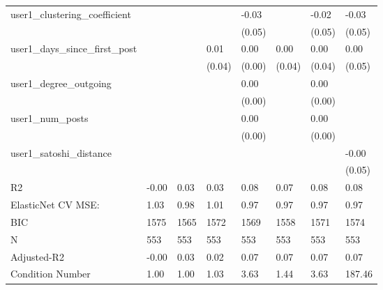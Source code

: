 \begin{table}
\begin{center}
\begin{tabular}{llllllll}
user1_clustering_coefficient                   &          &            &         & -0.03   &          & -0.02              & -0.03    \\
                                               &          &            &         & (0.05)  &          & (0.05)             & (0.05)   \\
user1_days_since_first_post                    &          &            & 0.01    & 0.00    & 0.00     & 0.00               & 0.00     \\
                                               &          &            & (0.04)  & (0.00)  & (0.04)   & (0.04)             & (0.05)   \\
user1_degree_outgoing                          &          &            &         & 0.00    &          & 0.00               &          \\
                                               &          &            &         & (0.00)  &          & (0.00)             &          \\
user1_num_posts                                &          &            &         & 0.00    &          & 0.00               &          \\
                                               &          &            &         & (0.00)  &          & (0.00)             &          \\
user1_satoshi_distance                         &          &            &         &         &          &                    & -0.00    \\
                                               &          &            &         &         &          &                    & (0.05)   \\
R2                                             & -0.00    & 0.03       & 0.03    & 0.08    & 0.07     & 0.08               & 0.08     \\
ElasticNet CV MSE:                             & 1.03     & 0.98       & 1.01    & 0.97    & 0.97     & 0.97               & 0.97     \\
BIC                                            & 1575     & 1565       & 1572    & 1569    & 1558     & 1571               & 1574     \\
N                                              & 553      & 553        & 553     & 553     & 553      & 553                & 553      \\
Adjusted-R2                                    & -0.00    & 0.03       & 0.02    & 0.07    & 0.07     & 0.07               & 0.07     \\
Condition Number                               & 1.00     & 1.00       & 1.03    & 3.63    & 1.44     & 3.63               & 187.46   \\
\hline
\end{tabular}
\end{center}
\end{table}